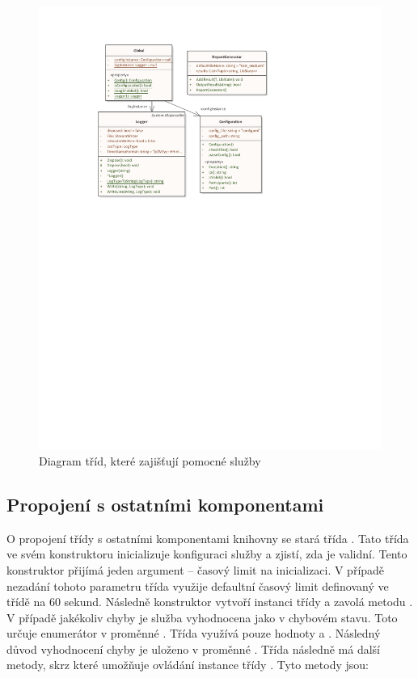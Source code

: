 \begin{figure}[htbp]
    \centering 
    \includegraphics[width=\textwidth]{assets/img/class_diagram/utility.pdf}
    \caption{Diagram tříd, které zajišťují pomocné služby}
    \label{fig:utility}
\end{figure}


\subsection{Propojení s ostatními komponentami}

O propojení třídy  s ostatními komponentami knihovny se stará třída .
Tato třída ve svém konstruktoru inicializuje konfiguraci služby a zjistí, zda je validní. Tento konstruktor přijímá jeden argument -- časový limit na inicializaci. V případě nezadání tohoto parametru třída využije defaultní časový limit definovaný ve třídě na 60 sekund. Následně konstruktor vytvoří instanci třídy  a zavolá metodu . V případě jakékoliv chyby je služba vyhodnocena jako v chybovém stavu. Toto určuje enumerátor  v proměnné . Třída využívá pouze hodnoty  a . Následný důvod vyhodnocení chyby je uloženo v proměnné . Třída následně má další metody, skrz které umožňuje ovládání instance třídy . Tyto metody jsou:

